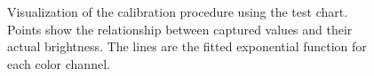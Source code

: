 \begin{figure}[hbt!]
    \centering
    \caption[Mappings from Sensor Measurements to Linear Light Intensity]{Visualization of the calibration procedure using the test chart. Points show the relationship between captured values and their actual brightness. The lines are the fitted exponential function for each color channel.}
\label{fig:chart_brightness_curves}
\end{figure}